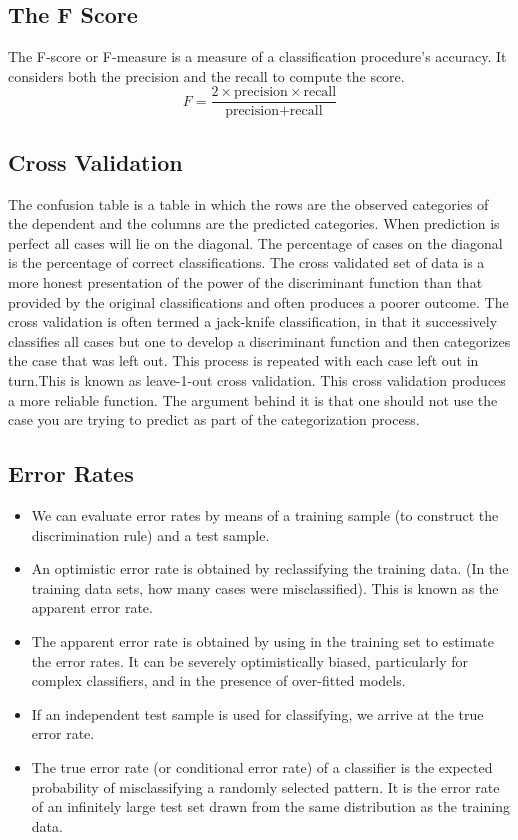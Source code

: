 \subsection*{The F Score}
The F-score or F-measure is a measure of a classification procedure’s accuracy.
It considers both the precision and the recall to compute the score.
\[ F = \frac{2 \times \mbox{precision} \times \mbox{recall}}{\mbox{precision} + \mbox{recall}}\]


\subsection*{ Cross Validation}
The confusion table is a table in which the rows are the observed categories of
the dependent and the columns are the predicted categories. When prediction
is perfect all cases will lie on the diagonal. The percentage of cases on the
diagonal is the percentage of correct classifications. The cross validated set of
data is a more honest presentation of the power of the discriminant function
than that provided by the original classifications and often produces a poorer
outcome. The cross validation is often termed a jack-knife classification, in
that it successively classifies all cases but one to develop a discriminant
function and then categorizes the case that was left out. This process is
repeated with each case left out in turn.This is known as leave-1-out cross
validation.
This cross validation produces a more reliable function. The argument
behind it is that one should not use the case you are trying to predict as part
of the categorization process.
\subsection*{Error Rates}
\begin{itemize}
	\item We can evaluate error rates by means of a training sample (to construct the
	discrimination rule) and a test sample.
	\item An optimistic error rate is obtained by reclassifying the training data. (In
	the training data sets, how many cases were misclassified). This is known
	as the apparent error rate.
	\item The apparent error rate is obtained by using in the training set to estimate
	the error rates. It can be severely optimistically biased, particularly for
	complex classifiers, and in the presence of over-fitted models.
	\item If an independent test sample is used for classifying, we arrive at the true
	error rate.
		\item The true error rate (or conditional error rate) of a classifier is the
	expected probability of misclassifying a randomly selected pattern. It is the
	error rate of an infinitely large test set drawn from the same distribution as
	the training data.
\end{itemize}

